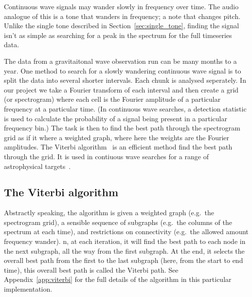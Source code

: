 \documentclass[paper-main.tex]{subfiles}
\begin{document}
 
Continuous wave signals may wander slowly in frequency over time. 
The audio analogue of this is a tone that wanders in frequency; a note that changes pitch. 
Unlike the single tone described in Section~\ref{sec:single_tone}, finding the signal isn’t as simple as searching for a peak in the spectrum for the full timeseries data.%



The data from a gravitaitonal wave observation run can be many months to a year. 
One method to search for a slowly wandering continuous wave signal is to split the data into several shorter intervals. 
Each chunk is analysed seperately. 
In our project we take a Fourier transform of each interval and then create a grid (or spectrogram) where each cell is the Fourier amplitude of a particular frequency at a particular time. 
(In continuous wave searches, a detection statistic is used to calculate the probability of a signal being present in a particular frequency bin.)
The task is then to find the best path through the spectrogram grid as if it where a weighted graph, where here the weights are the Fourier amplitudes. 
The Viterbi algorithm~\cite{Viterbi:1967} is an efficient method find the best path through the grid. 
It is used in contiuous wave searches for a range of astrophysical targets~\cite{ScoX1O2Viterbi:2019,ScoX1ViterbiO1:2017,MillhouseStrangMelatos:2020,PostMergerRemnantSearch:2019,SunEtAlSNR:2018,viterbi_application}. 




\subsection{The Viterbi algorithm}


Abstractly speaking, the algorithm is given a weighted graph (e.g.\ the spectrogram grid), a sensible sequence of subgraphs (e.g.\ the columns of the spectrum at each time), and restrictions on connectivity (e.g.\ the allowed amount frequency wander). 
n, at each iteration, it will find the best path to each node in the next subgraph, all the way from the first subgraph. 
At the end, it selects the overall best path from the first to the last subgraph (here, from the start to end time), this overall best path is called the Viterbi path. 
See Appendix~\ref{app:viterbi} for the full details of the algorithm in this particular implementation.
\end{document}
